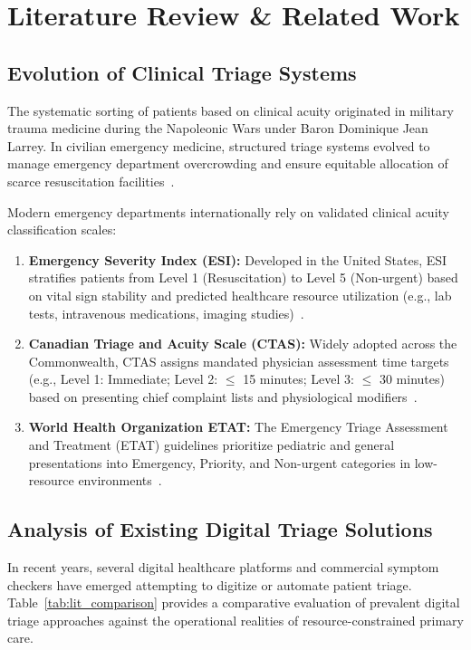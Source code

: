 \documentclass[11pt,a4paper,oneside]{report}
\begin{document}
\chapter{Literature Review \& Related Work}

\section{Evolution of Clinical Triage Systems}
The systematic sorting of patients based on clinical acuity originated in military trauma medicine during the Napoleonic Wars under Baron Dominique Jean Larrey. In civilian emergency medicine, structured triage systems evolved to manage emergency department overcrowding and ensure equitable allocation of scarce resuscitation facilities~\cite{etat2016}.

Modern emergency departments internationally rely on validated clinical acuity classification scales:
\begin{enumerate}[leftmargin=20pt]
  \item \textbf{Emergency Severity Index (ESI):} Developed in the United States, ESI stratifies patients from Level 1 (Resuscitation) to Level 5 (Non-urgent) based on vital sign stability and predicted healthcare resource utilization (e.g., lab tests, intravenous medications, imaging studies)~\cite{esi2020}.
  \item \textbf{Canadian Triage and Acuity Scale (CTAS):} Widely adopted across the Commonwealth, CTAS assigns mandated physician assessment time targets (e.g., Level 1: Immediate; Level 2: $\le$ 15 minutes; Level 3: $\le$ 30 minutes) based on presenting chief complaint lists and physiological modifiers~\cite{ctas1999}.
  \item \textbf{World Health Organization ETAT:} The Emergency Triage Assessment and Treatment (ETAT) guidelines prioritize pediatric and general presentations into Emergency, Priority, and Non-urgent categories in low-resource environments~\cite{etat2016}.
\end{enumerate}

\section{Analysis of Existing Digital Triage Solutions}
In recent years, several digital healthcare platforms and commercial symptom checkers have emerged attempting to digitize or automate patient triage. Table~\ref{tab:lit_comparison} provides a comparative evaluation of prevalent digital triage approaches against the operational realities of resource-constrained primary care.
\end{document}
